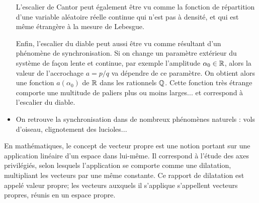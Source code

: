 \begin{itemize}
	L'escalier de Cantor peut également être vu comme la fonction de répartition d'une variable 
	aléatoire réelle continue qui n'est pas à densité, et qui est même étrangère à la 
	mesure de Lebesgue. 

	Enfin, l'escalier du diable peut aussi être vu comme résultant d'un phénomène de 
	synchronisation.
	Si on change un paramètre extérieur du système de façon lente et continue, par
	exemple l'amplitude $\alpha_0\in\mathbb R$, alors la valeur de l'accrochage $a=p/q$ va dépendre de
	ce paramètre. On obtient alors une fonction $a(\alpha_0)$ de $\mathbb R$ dans les rationnels $\mathbb Q$. 
	Cette fonction très étrange comporte une multitude de paliers plus ou moins larges... et correspond
	à l'escalier du diable.
	
   \item On retrouve la synchronisation dans de nombreux phénomènes naturels : vols d'oiseau, 
	clignotement des lucioles...
\end{itemize}
\medskipvm
En mathématiques, le concept de vecteur propre est une notion portant sur une 
application linéaire d'un espace dans lui-même. Il correspond à l'étude des axes privilégiés, selon 
lesquels l'application se comporte comme une dilatation, multipliant les vecteurs par une même constante. 
Ce rapport de dilatation est appelé valeur propre; les vecteurs auxquels il s'applique s'appellent 
vecteurs propres, réunis en un espace propre.


